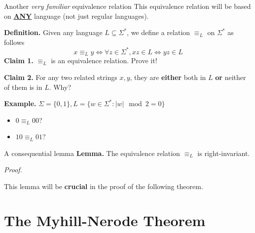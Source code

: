 \documentclass[10pt]{beamer}
\begin{document}
\begin{frame}[t]{Another \textit{very familiar} equivalence relation}
    This equivalence relation will be based on \underline{\textbf{ANY}} language (not just regular languages).

    \textbf{Definition.} Given any language $L \subseteq \Sigma^*$, we define a relation $\equiv_L$ on $\Sigma^*$ as follows
    \[
        x \equiv_L y \iff \forall z \in \Sigma^*, xz \in L \iff yz \in L
    \]
    \textbf{Claim 1.} $\equiv_L$ is an equivalence relation. Prove it!

    \textbf{Claim 2.} For any two related strings $x, y$, they are \textbf{either} both in $L$ \textbf{or} neither of them is in $L$. Why?

    \textbf{Example.} $\Sigma = \{0, 1\}, L = \{w \in \Sigma^* : |w| \mod 2 = 0\}$
    \begin{itemize}
        \setlength\itemsep{2em}
        \item $0 \equiv_L 00$?
        \item $10 \equiv_L 01$?
    \end{itemize}

\end{frame}

\begin{frame}[t]{A consequential lemma}
    \textbf{Lemma.} The equivalence relation $\equiv_L$ is right-invariant.

    \textit{Proof.}

    \vfill

    \vspace{14em}

    This lemma will be \textbf{crucial} in the proof of the following theorem.
\end{frame}



\section{The Myhill-Nerode Theorem}
\end{document}
